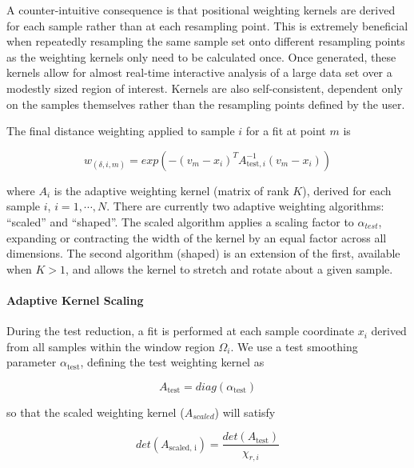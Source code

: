 A counter-intuitive consequence is that positional weighting kernels are
derived for each sample rather than at each resampling point.
This is extremely beneficial when repeatedly resampling the same sample set
onto different resampling points as the weighting kernels only need to be
calculated once.
Once generated, these kernels allow for almost real-time interactive analysis
of a large data set over a modestly sized region of interest.
Kernels are also self-consistent, dependent only on the samples themselves
rather than the resampling points defined by the user.

The final distance weighting applied to sample $i$ for a fit at point $m$ is

\begin{equation}
     w_(\delta, i, m) = exp \left(
              -(v_m - x_i)^T
               A_{\text{test}, i}^{-1}
               (v_m - x_i)
     \right)
     \label{eq:equation37}
\end{equation}

where $A_i$ is the adaptive weighting kernel (matrix of rank $K$), derived
for each sample $i$, $i = 1, \cdots, N$.
There are currently two adaptive weighting algorithms: ``scaled'' and
``shaped''.
The scaled algorithm applies a scaling factor to $\alpha_{test}$, expanding
or contracting the width of the kernel by an equal factor across all dimensions.
The second algorithm (shaped) is an extension of the first, available when
$K>1$, and allows the kernel to stretch and rotate about a given sample.

\paragraph{Adaptive Kernel Scaling}
\label{paragraph:adaptive-kernel-scaling}
During the test reduction, a fit is performed at each sample coordinate
$x_i$ derived from all samples within the window region $\Omega_i$.
We use a test smoothing parameter $\alpha_{\text{test}}$, defining the test
weighting kernel as

\begin{equation}
    A_{\text{test}} = diag(\alpha_{\text{test}})
    \label{eq:equation38}
\end{equation}

so that the scaled weighting kernel ($A_{scaled}$) will satisfy

\begin{equation}
    det(A_{\text{scaled, i}}) = \frac{det(A_{\text{test}})}{\chi_{r, i}}
    \label{eq:equation39}
\end{equation}

